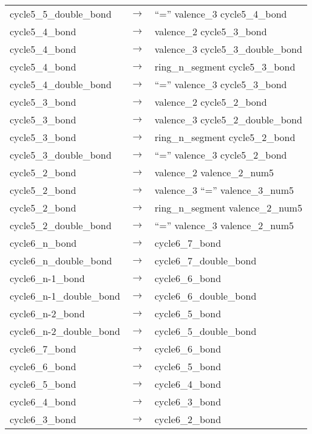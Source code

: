 \documentclass[../Document.tex]{subfiles}
\begin{document}
\begin{longtable}{m{} p{} p{}}
    cycle5\_5\_double\_bond & $\rightarrow$ & ``='' valence\_3 cycle5\_4\_bond \\
    cycle5\_4\_bond & $\rightarrow$ & valence\_2 cycle5\_3\_bond \\
    cycle5\_4\_bond & $\rightarrow$ & valence\_3 cycle5\_3\_double\_bond \\
    cycle5\_4\_bond & $\rightarrow$ & ring\_n\_segment cycle5\_3\_bond \\
    cycle5\_4\_double\_bond & $\rightarrow$ & ``='' valence\_3 cycle5\_3\_bond \\
    cycle5\_3\_bond & $\rightarrow$ & valence\_2 cycle5\_2\_bond \\
    cycle5\_3\_bond & $\rightarrow$ & valence\_3 cycle5\_2\_double\_bond \\
    cycle5\_3\_bond & $\rightarrow$ & ring\_n\_segment cycle5\_2\_bond \\
    cycle5\_3\_double\_bond & $\rightarrow$ & ``='' valence\_3 cycle5\_2\_bond \\
    cycle5\_2\_bond & $\rightarrow$ & valence\_2 valence\_2\_num5 \\
    cycle5\_2\_bond & $\rightarrow$ & valence\_3 ``='' valence\_3\_num5 \\
    cycle5\_2\_bond & $\rightarrow$ & ring\_n\_segment valence\_2\_num5 \\
    cycle5\_2\_double\_bond & $\rightarrow$ & ``='' valence\_3 valence\_2\_num5 \\
    cycle6\_n\_bond & $\rightarrow$ & cycle6\_7\_bond \\
    cycle6\_n\_double\_bond & $\rightarrow$ & cycle6\_7\_double\_bond \\
    cycle6\_n-1\_bond & $\rightarrow$ & cycle6\_6\_bond \\
    cycle6\_n-1\_double\_bond & $\rightarrow$ & cycle6\_6\_double\_bond \\
    cycle6\_n-2\_bond & $\rightarrow$ & cycle6\_5\_bond \\
    cycle6\_n-2\_double\_bond & $\rightarrow$ & cycle6\_5\_double\_bond \\
    cycle6\_7\_bond & $\rightarrow$ & cycle6\_6\_bond \\
    cycle6\_6\_bond & $\rightarrow$ & cycle6\_5\_bond \\
    cycle6\_5\_bond & $\rightarrow$ & cycle6\_4\_bond \\
    cycle6\_4\_bond & $\rightarrow$ & cycle6\_3\_bond \\
    cycle6\_3\_bond & $\rightarrow$ & cycle6\_2\_bond \\

\end{longtable}
\end{document}
